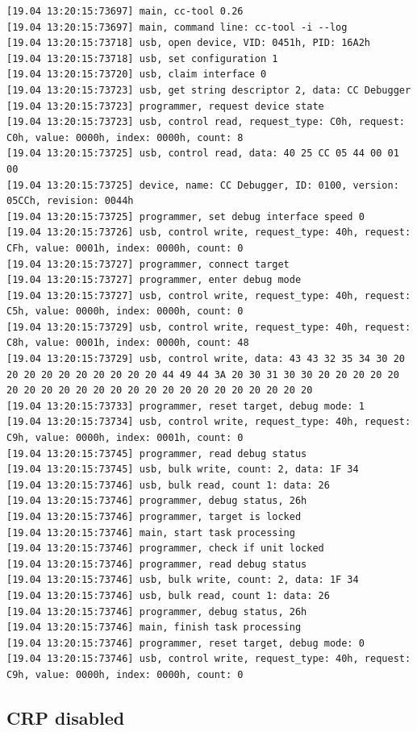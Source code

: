 \begin{verbatim}
[19.04 13:20:15:73697] main, cc-tool 0.26
[19.04 13:20:15:73697] main, command line: cc-tool -i --log 
[19.04 13:20:15:73718] usb, open device, VID: 0451h, PID: 16A2h
[19.04 13:20:15:73718] usb, set configuration 1
[19.04 13:20:15:73720] usb, claim interface 0
[19.04 13:20:15:73723] usb, get string descriptor 2, data: CC Debugger
[19.04 13:20:15:73723] programmer, request device state
[19.04 13:20:15:73723] usb, control read, request_type: C0h, request: C0h, value: 0000h, index: 0000h, count: 8
[19.04 13:20:15:73725] usb, control read, data: 40 25 CC 05 44 00 01 00
[19.04 13:20:15:73725] device, name: CC Debugger, ID: 0100, version: 05CCh, revision: 0044h
[19.04 13:20:15:73725] programmer, set debug interface speed 0
[19.04 13:20:15:73726] usb, control write, request_type: 40h, request: CFh, value: 0001h, index: 0000h, count: 0
[19.04 13:20:15:73727] programmer, connect target
[19.04 13:20:15:73727] programmer, enter debug mode
[19.04 13:20:15:73727] usb, control write, request_type: 40h, request: C5h, value: 0000h, index: 0000h, count: 0
[19.04 13:20:15:73729] usb, control write, request_type: 40h, request: C8h, value: 0001h, index: 0000h, count: 48
[19.04 13:20:15:73729] usb, control write, data: 43 43 32 35 34 30 20 20 20 20 20 20 20 20 20 20 44 49 44 3A 20 30 31 30 30 20 20 20 20 20 20 20 20 20 20 20 20 20 20 20 20 20 20 20 20 20 20 20
[19.04 13:20:15:73733] programmer, reset target, debug mode: 1
[19.04 13:20:15:73734] usb, control write, request_type: 40h, request: C9h, value: 0000h, index: 0001h, count: 0
[19.04 13:20:15:73745] programmer, read debug status
[19.04 13:20:15:73745] usb, bulk write, count: 2, data: 1F 34
[19.04 13:20:15:73746] usb, bulk read, count 1: data: 26
[19.04 13:20:15:73746] programmer, debug status, 26h
[19.04 13:20:15:73746] programmer, target is locked
[19.04 13:20:15:73746] main, start task processing
[19.04 13:20:15:73746] programmer, check if unit locked
[19.04 13:20:15:73746] programmer, read debug status
[19.04 13:20:15:73746] usb, bulk write, count: 2, data: 1F 34
[19.04 13:20:15:73746] usb, bulk read, count 1: data: 26
[19.04 13:20:15:73746] programmer, debug status, 26h
[19.04 13:20:15:73746] main, finish task processing
[19.04 13:20:15:73746] programmer, reset target, debug mode: 0
[19.04 13:20:15:73746] usb, control write, request_type: 40h, request: C9h, value: 0000h, index: 0000h, count: 0
\end{verbatim}

\hypertarget{crp-disabled}{%
\subsection{\texorpdfstring{CRP
disabled\label{appendix_crp_disabled}}{CRP disabled}}\label{crp-disabled}}

